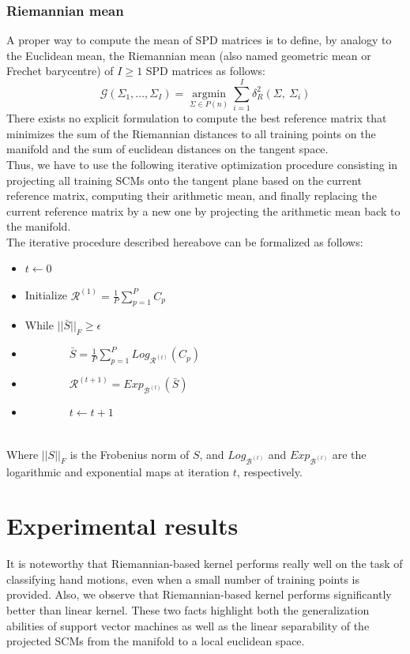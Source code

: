 \documentclass[a4paper,11pt]{report}
\begin{document}
\subsection{Riemannian mean}
A proper way to compute the mean of SPD matrices is to define, by analogy to the Euclidean mean, the Riemannian mean (also named geometric mean or Frechet barycentre) of $I \geq 1$ SPD matrices as follows:
$$\mathcal{G}\left(\Sigma_1, ..., \Sigma_I \right) = \mathop{\mathrm{argmin}}\limits_{\Sigma \in P(n)} \sum_{i=1}^I \delta_R^2 \left( \Sigma,\ \Sigma_i \right) $$
There exists no explicit formulation to compute the best reference matrix that minimizes the sum of the Riemannian distances to all training points on the manifold and the sum of euclidean distances on the tangent space.\\
Thus, we have to use the following iterative optimization procedure consisting in projecting all training SCMs onto the tangent plane based on the current reference matrix, computing their arithmetic mean, and finally replacing the current reference matrix by a new one by projecting the arithmetic mean back to the manifold.\\
The iterative procedure described hereabove can be formalized as follows:
\begin{itemize}
\item $t \leftarrow 0$
\item Initialize $\mathcal{R}^{(1)} = \frac{1}{P} \sum\limits_{p=1}^{P} C_p$
\item While $||\bar{S}||_F \ge \epsilon$
\item \ \ \ \ \ \ \ \ $\bar{S} = \frac{1}{P} \sum\limits_{p=1}^{P} Log_{\mathcal{R}^{(t)}} (C_p)$
\item \ \ \ \ \ \ \ \ $\mathcal{R}^{(t+1)} = Exp_{\mathcal{B}^{(t)}} (\bar{S})$
\item \ \ \ \ \ \ \ \ $t \leftarrow t + 1$
\end{itemize}\ \\
Where $||S||_F$ is the Frobenius norm of $S$, and $Log_{\mathcal{B}^{(t)}}$ and $Exp_{\mathcal{B}^{(t)}}$
are the logarithmic and exponential maps at iteration $t$, respectively.

\chapter{Experimental results}

It is noteworthy that Riemannian-based kernel performs really well on the task of classifying hand
motions, even when a small number of training points is provided. 
Also, we observe that Riemannian-based kernel performs significantly better than linear kernel.
These two facts highlight both the generalization abilities of support vector machines as well as the linear separability
of the projected SCMs from the manifold to a local euclidean space.
\end{document}
